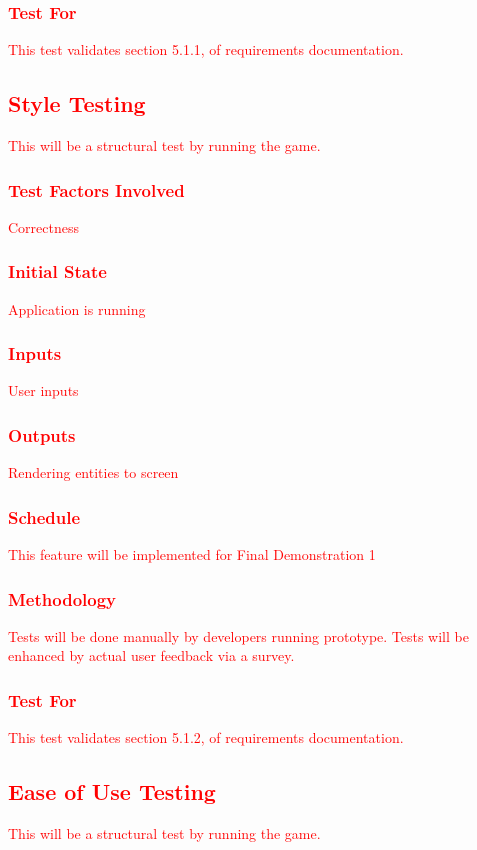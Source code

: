 \documentclass[11pt, oneside]{article}   	%
\begin{document}
\subsubsection{\textcolor{red}{Test For}}
\textcolor{red}{This test validates section 5.1.1, of requirements documentation.}


\subsection{\textcolor{red}{Style Testing}}
\textcolor{red}{This will be a structural test by running the game.}
\subsubsection{\textcolor{red}{Test Factors Involved}}
\textcolor{red}{Correctness}
\subsubsection{\textcolor{red}{Initial State}}
\textcolor{red}{Application is running}
\subsubsection{\textcolor{red}{Inputs}}
\textcolor{red}{User inputs}
\subsubsection{\textcolor{red}{Outputs}}
\textcolor{red}{Rendering entities to screen}
\subsubsection{\textcolor{red}{Schedule}}
\textcolor{red}{This feature will be implemented for Final Demonstration 1}
\subsubsection{\textcolor{red}{Methodology}}
\textcolor{red}{Tests will be done manually by developers running prototype. Tests will be enhanced by actual user feedback via a survey.}
\subsubsection{\textcolor{red}{Test For}}
\textcolor{red}{This test validates section 5.1.2, of requirements documentation.}



\subsection{\textcolor{red}{Ease of Use Testing}}
\textcolor{red}{This will be a structural test by running the game.}
\end{document}
